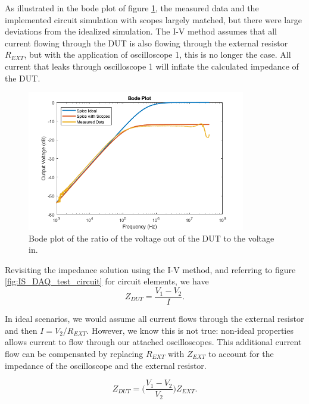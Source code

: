 \par As illustrated in the bode plot of figure \ref{fig:test_circuit_bode}, the measured data and the implemented circuit simulation with scopes largely matched, but there were large deviations from the idealized simulation. The I-V method assumes that all current flowing through the DUT is also flowing through the external resistor $R_{EXT}$, but with the application of oscilloscope 1, this is no longer the case. All current that leaks through oscilloscope 1 will inflate the calculated impedance of the DUT.  

\begin{figure}[h]
    \centering
    \includegraphics[width=0.85\textwidth]{images/spice-measured-comp.png}
    \caption[Bode plot of I-V data]{Bode plot of the ratio of the voltage out of the DUT to the voltage in.}
    \label{fig:test_circuit_bode}
\end{figure}

\par Revisiting the impedance solution using the I-V method, and referring to figure \ref{fig:IS_DAQ_test_circuit} for circuit elements, we have
\begin{equation}
    Z_{DUT} = \frac{V_1 - V_2}{I}.
\end{equation}

\noindent In ideal scenarios, we would assume all current flows through the external resistor and then $I = V_2 / R_{EXT}$. However, we know this is not true: non-ideal properties allows current to flow through our attached oscilloscopes. This additional current flow can be compensated by replacing $R_{EXT}$ with $Z_{EXT}$ to account for the impedance of the oscilloscope and the external resistor. 

\begin{equation}
    Z_{DUT} = \bigg(\frac{V_1 - V_2}{V_2}\bigg)Z_{EXT}.
    \label{eqn:corrected_IV}
\end{equation}

